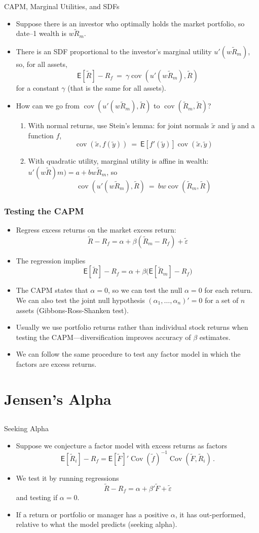 \documentclass[10pt]{beamer}
\DeclareMathOperator{\cov}{cov}
\DeclareMathOperator{\Cov}{Cov}
\newcommand{\bi}{\begin{itemize}}
\newcommand{\ei}{\end{itemize}}
\newcommand{\im}{\item}
\newcommand{\mye}{\ensuremath{\mathsf{E}}}
\newcommand{\bfr}{\begin{frame}}
\newcommand{\tve}{\tilde{\varepsilon}}
\newcommand{\tx}{\tilde{x}}
\newcommand{\ty}{\tilde{y}}
\newcommand{\tF}{\tilde{F}}
\newcommand{\tf}{\tilde{f}}
\newcommand{\tr}{\widetilde{R}}
\begin{document}
\begin{frame}{CAPM, Marginal Utilities, and SDFs}
    \bi 
\im Suppose there is an investor who optimally holds the market portfolio, so date--1 wealth is $w\tr_m$.  
\im There is an SDF proportional to the investor's marginal utility $u'(w\tr_m)$, so, for all assets,
$$\mye[\tr]-R_f \ = \ \gamma \cov(u'(w\tr_m),\tr)$$
for a constant $\gamma$ (that is the same for all assets).

\im How can we go from $\cov(u'(w\tr_m),\tr)$ to $\cov(\tr_m,\tr)$?
\pause
\begin{enumerate}
\im With normal returns, use Stein's lemma: for joint normals $\tx$ and $\ty$ and a function $f$,
$$\cov(\tx, f(\ty)) \ = \ \mye[f'(\ty)] \cov(\tx, \ty)$$
\im With quadratic utility, marginal utility is affine in wealth: $u'(w\tr)m) = a + b w\tr_m$, so
$$\cov(u'(w\tr_m),\tr) \ = \ b w \cov(\tr_m,\tr)$$
\end{enumerate}
\ei 
\end{frame}

\bfr\frametitle{Testing the CAPM}
\bi
\im Regress excess returns on the market excess return:
$$\tr-R_f = \alpha + \beta(\tr_m-R_f) + \tve$$
\im The regression implies
$$\mye[\tr] -R_f = \alpha + \beta \big(\mye[\tr_m]-R_f\big)$$
\im The CAPM states that $\alpha=0$, so we can test the null $\alpha=0$ for each return.  We can also test the joint null hypothesis $(\alpha_1, \ldots, \alpha_n)' = 0$ for a set of $n$ assets (Gibbons-Ross-Shanken test).
\im Usually we use portfolio returns rather than individual stock returns when testing the CAPM---diversification improves accuracy of $\beta$ estimates.
\im We can follow the same procedure to test any factor model in which the factors are excess returns.
\ei
\end{frame}

\section{Jensen's Alpha}\subsection{}

\begin{frame}{Seeking Alpha}
\bi 
\im Suppose we conjecture a factor model with excess returns as factors
$$\mye[\tr_i] - R_f =  \mye[\tF]'\Cov(\tf)^{-1}\Cov(\tF,\tr_i)\,.$$
\im We test it by running regressions
$$\tr - R_f = \alpha + \beta'\tF + \tve$$
and testing if $\alpha=0$.

\im If a return or portfolio or manager has a positive $\alpha$, it has out-performed, relative to what the model predicts (seeking alpha).
\ei 
\end{frame}
\end{document}

